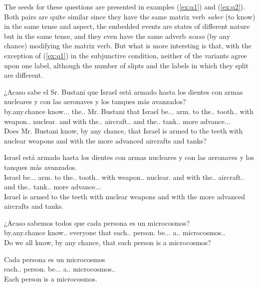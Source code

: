 The seeds for these questions are presented in examples (\ref{ex:q1}) and (\ref{ex:q2}). Both pairs are quite similar since they have the same matrix verb \textit{saber} (to know) in the same tense and aspect, the embedded events are states of different nature but in the same tense, and they even have the same adverb \textit{acaso} (by any chance) modifying the matrix verb. But what is more intersting is that, with the exception of (\ref{ex:q1}) in the subjunctive condition, neither of the variants agree upon one label, although the number of slipts and the labels in which they split are different.\\

\begin{exe}
  \ex\label{ex:q1}
    \begin{xlist}
      \item{\gll ¿Acaso sabe el Sr. Bustani que Israel está armado hasta los dientes con armas nucleares y con las aeronaves y los tanques más avanzados?\\ by.any.chance know.\Prs.\Ind.\Tsg{} the.\M.\Sg{} Mr. Bustani that Israel be.\Prs.\Ind.\Tsg{} arm.\Ptcp{} to the.\M.\Pl{} tooth.\M.\Pl{} with weapon.\F.\Sg{} nuclear.\Pl{} and with the.\F.\Pl{} aircraft.\F.\Pl{} and the.\M.\Pl{} tank.\M.\Pl{} more advance.\Ptcp.\M.\Pl{} \\\glt Does Mr. Bustani know, by any chance, that Israel is armed to the teeth with nuclear weapons and with the more advanced aircrafts and tanks?}
      \item{\gll Israel está armado hasta los dientes con armas nucleares y con las aeronaves y los tanques más avanzados.\\ Israel be.\Prs.\Ind.\Tsg{} arm.\Ptcp{} to the.\M.\Pl{} tooth.\M.\Pl{} with weapon.\F.\Sg{} nuclear.\Pl{} and with the.\F.\Pl{} aircraft.\F.\Pl{} and the.\M.\Pl{} tank.\M.\Pl{} more advance.\Ptcp.\M.\Pl{}\\\glt Israel is armed to the teeth with nuclear weapons and with the more advanced aircrafts and tanks.} \label{ex:hypq1}
    \end{xlist}
    \ex\label{ex:q2}
    \begin{xlist}
      \item{\gll ¿Acaso sabemos todos que cada persona es un microcosmos?\\ by.any.chance know.\F.\Sg{} everyone that each.\F.\Sg{} person\F.\Sg{} be.\Prs.\Ind.\Tsg{} a.\M.\Sg{} microcosmos.\M.\Sg{} \\\glt Do we all know, by any chance, that each person is a microcosmos?}
      \item{\gll Cada persona es un microcosmos\\ each.\F.\Sg{} person\F.\Sg{} be.\Prs.\Ind.\Tsg{} a.\M.\Sg{} microcosmos.\M.\Sg{} \\\glt Each person is a microcosmos.} \label{ex:hypq2}
    \end{xlist}
\end{exe}


